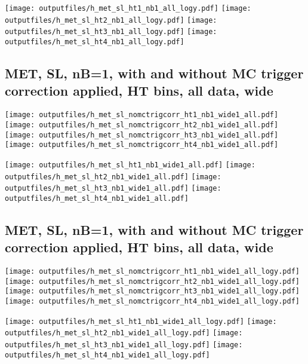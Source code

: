 \documentclass[11pt]{article}
\begin{document}
    \noindent
     \texttt{[image: outputfiles/h\_met\_sl\_ht1\_nb1\_all\_logy.pdf]}
     \texttt{[image: outputfiles/h\_met\_sl\_ht2\_nb1\_all\_logy.pdf]}
     \texttt{[image: outputfiles/h\_met\_sl\_ht3\_nb1\_all\_logy.pdf]}
     \texttt{[image: outputfiles/h\_met\_sl\_ht4\_nb1\_all\_logy.pdf]}


     \clearpage
     \subsection{ MET, SL, nB=1, with and without MC trigger correction applied, HT bins, all data, wide}

    \noindent
     \texttt{[image: outputfiles/h\_met\_sl\_nomctrigcorr\_ht1\_nb1\_wide1\_all.pdf]}
     \texttt{[image: outputfiles/h\_met\_sl\_nomctrigcorr\_ht2\_nb1\_wide1\_all.pdf]}
     \texttt{[image: outputfiles/h\_met\_sl\_nomctrigcorr\_ht3\_nb1\_wide1\_all.pdf]}
     \texttt{[image: outputfiles/h\_met\_sl\_nomctrigcorr\_ht4\_nb1\_wide1\_all.pdf]}

    \noindent
     \texttt{[image: outputfiles/h\_met\_sl\_ht1\_nb1\_wide1\_all.pdf]}
     \texttt{[image: outputfiles/h\_met\_sl\_ht2\_nb1\_wide1\_all.pdf]}
     \texttt{[image: outputfiles/h\_met\_sl\_ht3\_nb1\_wide1\_all.pdf]}
     \texttt{[image: outputfiles/h\_met\_sl\_ht4\_nb1\_wide1\_all.pdf]}

    \clearpage
     \subsection{ MET, SL, nB=1, with and without MC trigger correction applied, HT bins, all data, wide}

    \noindent
     \texttt{[image: outputfiles/h\_met\_sl\_nomctrigcorr\_ht1\_nb1\_wide1\_all\_logy.pdf]}
     \texttt{[image: outputfiles/h\_met\_sl\_nomctrigcorr\_ht2\_nb1\_wide1\_all\_logy.pdf]}
     \texttt{[image: outputfiles/h\_met\_sl\_nomctrigcorr\_ht3\_nb1\_wide1\_all\_logy.pdf]}
     \texttt{[image: outputfiles/h\_met\_sl\_nomctrigcorr\_ht4\_nb1\_wide1\_all\_logy.pdf]}


    \noindent
     \texttt{[image: outputfiles/h\_met\_sl\_ht1\_nb1\_wide1\_all\_logy.pdf]}
     \texttt{[image: outputfiles/h\_met\_sl\_ht2\_nb1\_wide1\_all\_logy.pdf]}
     \texttt{[image: outputfiles/h\_met\_sl\_ht3\_nb1\_wide1\_all\_logy.pdf]}
     \texttt{[image: outputfiles/h\_met\_sl\_ht4\_nb1\_wide1\_all\_logy.pdf]}
\end{document}
